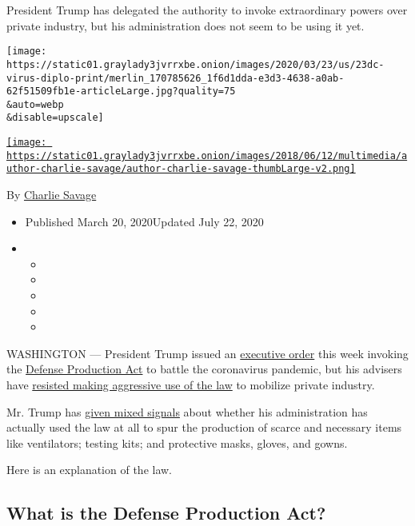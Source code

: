 President Trump has delegated the authority to invoke extraordinary
powers over private industry, but his administration does not seem to be
using it yet.

\texttt{[image: https://static01.graylady3jvrrxbe.onion/images/2020/03/23/us/23dc-virus-diplo-print/merlin\_170785626\_1f6d1dda-e3d3-4638-a0ab-62f51509fb1e-articleLarge.jpg?quality=75\\\&auto=webp\\\&disable=upscale]}

\href{https://www.nytimes3xbfgragh.onion/by/charlie-savage}{\texttt{[image: https://static01.graylady3jvrrxbe.onion/images/2018/06/12/multimedia/author-charlie-savage/author-charlie-savage-thumbLarge-v2.png]}}

By \href{https://www.nytimes3xbfgragh.onion/by/charlie-savage}{Charlie
Savage}

\begin{itemize}
\item
  Published March 20, 2020Updated July 22, 2020
\item
  \begin{itemize}
  \item
  \item
  \item
  \item
  \item
  \end{itemize}
\end{itemize}

WASHINGTON --- President Trump issued an
\href{https://www.whitehouse.gov/presidential-actions/executive-order-prioritizing-allocating-health-medical-resources-respond-spread-covid-19/}{executive
order} this week invoking the
\href{https://www.nytimes3xbfgragh.onion/2020/07/22/us/politics/coronavirus-defense-production-act.html}{Defense
Production Act} to battle the coronavirus pandemic, but his advisers
have
\href{https://www.nytimes3xbfgragh.onion/2020/03/20/us/politics/trump-coronavirus-supplies.html}{resisted
making aggressive use of the law} to mobilize private industry.

Mr. Trump has
\href{https://www.nytimes3xbfgragh.onion/2020/03/20/us/politics/trump-coronavirus-supplies.html}{given
mixed signals} about whether his administration has actually used the
law at all to spur the production of scarce and necessary items like
ventilators; testing kits; and protective masks, gloves, and gowns.

Here is an explanation of the law.

\hypertarget{what-is-the-defense-production-act}{%
\subsection{What is the Defense Production
Act?}\label{what-is-the-defense-production-act}}

